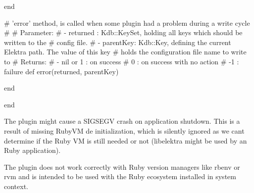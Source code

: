 \begin{DoxyCode}
  end


  # 'error' method, is called when some plugin had a problem during a write cycle
  #
  # Parameter:
  #  - returned : Kdb::KeySet, holding all keys which should be written to the
  #               config file.
  #  - parentKey: Kdb::Key, defining the current Elektra path. The value of this key
  #               holds the configuration file name to write to
  # Returns:
  #  - nil or 1 : on success
  #           0 : on success with no action
  #          -1 : failure
  def error(returned, parentKey)

  end

end
\end{DoxyCode}



\begin{DoxyItemize}
\item The plugin might cause a S\+I\+G\+S\+E\+GV crash on application shutdown. This is a result of missing Ruby\+VM de initialization, which is silently ignored as we can\textquotesingle{}t determine if the Ruby VM is still needed or not (libelektra might be used by an Ruby application).
\item The plugin does not work correctly with Ruby version managers like {\ttfamily rbenv} or {\ttfamily rvm} and is intended to be used with the Ruby ecosystem installed in system context. 
\end{DoxyItemize}